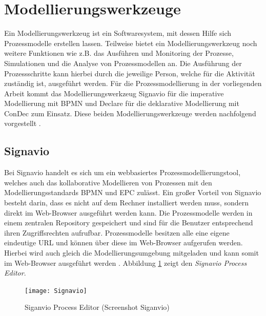 \section{Modellierungswerkzeuge}\label{sec:chapter3:Modellierungswerkzeuge}
Ein Modellierungswerkzeug ist ein Softwaresystem, mit dessen Hilfe sich Prozessmodelle erstellen  lassen. Teilweise bietet ein Modellierungswerkzeug noch weitere Funktionen wie z.B. das Ausführen und Monitoring der Prozesse, Simulationen und die Analyse von Prozessmodellen an. Die Ausführung der Prozessschritte kann hierbei durch die jeweilige Person, welche für die Aktivität zuständig ist, ausgeführt werden. Für die Prozessmodellierung in der vorliegenden Arbeit kommt das Modellierungswerkzeug Signavio für die imperative Modellierung mit BPMN und Declare für die deklarative Modellierung mit ConDec zum Einsatz. Diese beiden Modellierungswerkzeuge werden nachfolgend vorgestellt \cite{gadatsch2012}.

\subsection{Signavio}

Bei Signavio handelt es sich um ein webbasiertes Prozessmodellierungstool, welches auch das kollaborative Modellieren von Prozessen mit den Modellierungsstandards BPMN und EPC zulässt. Ein großer Vorteil von Signavio besteht darin, dass es nicht auf dem Rechner installiert werden muss, sondern direkt im Web-Browser ausgeführt werden kann. Die Prozessmodelle werden in einem zentralen Repository gespeichert und sind für die Benutzer entsprechend ihren Zugriffsrechten aufrufbar. Prozessmodelle besitzen alle eine eigene eindeutige URL und können über diese im Web-Browser aufgerufen werden. Hierbei wird auch gleich die Modellierungsumgebung mitgeladen und kann somit im Web-Browser ausgeführt werden \cite{quteprints}. Abbildung \ref{fig:Signavio} zeigt den \textit{Signavio Process Editor}.

\begin{figure}[H]
\begin{center}
  \texttt{[image: Signavio]} %
  \caption{Siganvio Process Editor (Screenshot Siganvio)}
  \label{fig:Signavio}
\end{center}
\end{figure} 


